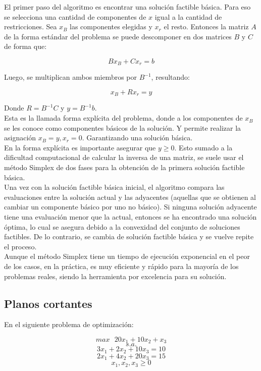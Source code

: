 \documentclass[12pt]{report}
\begin{document}
El primer paso del algoritmo es encontrar una solución factible básica. Para eso se selecciona una cantidad de componentes de $x$ igual a la cantidad de restricciones. Sea $x_B$ las componentes elegidas y $x_r$ el resto. Entonces la matriz $A$ de la forma estándar del problema se puede descomponer en dos matrices $B$ y $C$ de forma que:

$$Bx_B+Cx_r=b$$

Luego, se multiplican ambos miembros por $B^{-1}$, resultando:

$$x_B+Rx_r=y$$

Donde $R=B^{-1}C$ y $y=B^{-1}b$.\\

Esta es la llamada forma explícita del problema, donde a los componentes de $x_B$ se les conoce como componentes básicos de la solución. Y permite realizar la asignación $x_B=y, x_r=0$. Garantizando una solución básica. \\

En la forma explícita es importante asegurar que $y\geq 0$. Esto sumado a la dificultad computacional de calcular la inversa de una matriz, se suele usar el método Simplex de dos fases para la obtención de la primera solución factible básica.\\

Una vez con la solución factible básica inicial, el algoritmo compara las evaluaciones entre la solución actual y las adyacentes (aquellas que se obtienen al cambiar un componente básico por uno no básico). Si ninguna solución adyacente tiene una evaluación menor que la actual, entonces se ha encontrado una solución óptima, lo cual se asegura debido a la convexidad del conjunto de soluciones factibles. De lo contrario, se cambia de solución factible básica y se vuelve repite el proceso.\\

Aunque el método Simplex tiene un tiempo de ejecución exponencial en el peor de los casos, en la práctica, es muy eficiente y rápido para la mayoría de los problemas reales, siendo la herramienta por excelencia para su solución. 

\subsection{Planos cortantes\\}

En el siguiente problema de optimización:

$$max \text{ } 20x_1+10x_2+x_3$$
$$s.a.$$
$$3x_1+2x_2+10x_3=10$$
$$2x_1+4x_2+20x_3=15$$
$$x_1,x_2,x_3\geq 0$$\\
\end{document}
